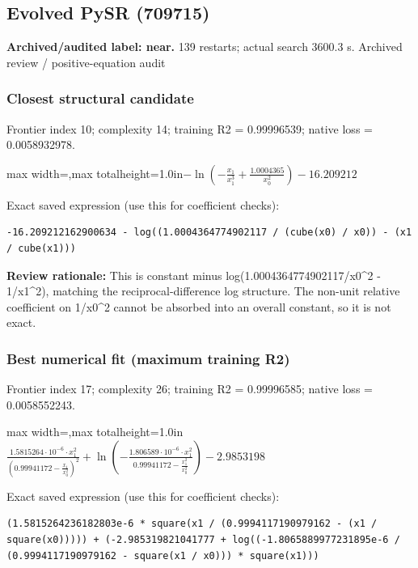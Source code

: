 \documentclass[10pt,letterpaper,landscape]{article}
\begin{document}
\begin{minipage}[t]{0.485\textwidth}
\subsection*{Evolved PySR (709715)}
\textbf{Archived/audited label: near.} 139 restarts; actual search 3600.3 s.
{\small Archived review / positive-equation audit}
\subsubsection*{Closest structural candidate}
Frontier index 10; complexity 14; training R2 = 0.99996539; native loss = 0.0058932978.
\begin{center}\begin{adjustbox}{max width=\linewidth,max totalheight=1.0in}$\displaystyle - \ln{\left(- \frac{x_{1}}{x_{1}^{3}} + \frac{1.0004365}{x_{0}^{2}} \right)} - 16.209212$\end{adjustbox}\end{center}
{\scriptsize Exact saved expression (use this for coefficient checks):}
\begin{lstlisting}
-16.209212162900634 - log((1.0004364774902117 / (cube(x0) / x0)) - (x1 / cube(x1)))
\end{lstlisting}
{\small\textbf{Review rationale:} This is constant minus log(1.0004364774902117/x0\textasciicircum{}2 - 1/x1\textasciicircum{}2), matching the reciprocal-difference log structure. The non-unit relative coefficient on 1/x0\textasciicircum{}2 cannot be absorbed into an overall constant, so it is not exact.}
\subsubsection*{Best numerical fit (maximum training R2)}
Frontier index 17; complexity 26; training R2 = 0.99996585; native loss = 0.0058552243.
\begin{center}\begin{adjustbox}{max width=\linewidth,max totalheight=1.0in}$\displaystyle \frac{1.5815264 \cdot 10^{-6} \cdot x_{1}^{2}}{\left(0.99941172 - \frac{x_{1}}{x_{0}^{2}}\right)^{2}} + \ln{\left(- \frac{1.806589 \cdot 10^{-6} \cdot x_{1}^{2}}{0.99941172 - \frac{x_{1}^{2}}{x_{0}^{2}}} \right)} - 2.9853198$\end{adjustbox}\end{center}
{\scriptsize Exact saved expression (use this for coefficient checks):}
\begin{lstlisting}
(1.5815264236182803e-6 * square(x1 / (0.9994117190979162 - (x1 / square(x0))))) + (-2.985319821041777 + log((-1.8065889977231895e-6 / (0.9994117190979162 - square(x1 / x0))) * square(x1)))
\end{lstlisting}
\end{minipage}
\clearpage{}\label{rydberg-10001}
\end{document}
